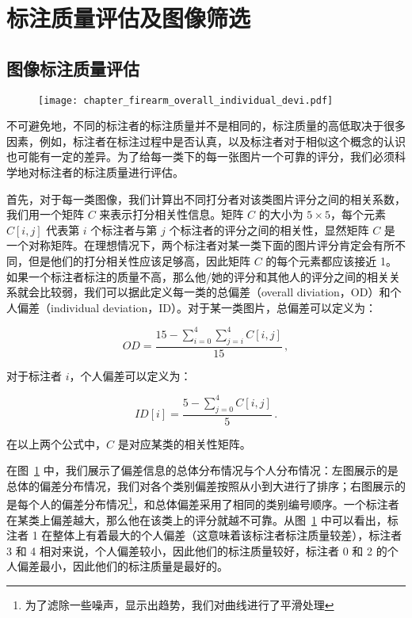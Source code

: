 \section{标注质量评估及图像筛选}\label{sec:label_quality_assess_filtering}
\subsection{图像标注质量评估}

\begin{figure}[t]
	\centering
	\texttt{[image: chapter\_firearm\_overall\_individual\_devi.pdf]}
	\label{fig:deviation_info}
\end{figure}

不可避免地，不同的标注者的标注质量并不是相同的，标注质量的高低取决于很多因素，例如，标注者在标注过程中是否认真，以及标注者对于相似这个概念的认识也可能有一定的差异。为了给每一类下的每一张图片一个可靠的评分，我们必须科学地对标注者的标注质量进行评估。

首先，对于每一类图像，我们计算出不同打分者对该类图片评分之间的相关系数，我们用一个矩阵 $C$ 来表示打分相关性信息。矩阵 $C$ 的大小为 $5 \times 5$，每个元素 $C[i,j]$ 代表第 $i$ 个标注者与第 $j$ 个标注者的评分之间的相关性，显然矩阵 $C$ 是一个对称矩阵。在理想情况下，两个标注者对某一类下面的图片评分肯定会有所不同，但是他们的打分相关性应该足够高，因此矩阵 $C$ 的每个元素都应该接近 1。如果一个标注者标注的质量不高，那么他/她的评分和其他人的评分之间的相关关系就会比较弱，我们可以据此定义每一类的总偏差（overall diviation，OD）和个人偏差（individual deviation，ID）。对于某一类图片，总偏差可以定义为：

\begin{equation}
OD = \frac{15 - \sum_{i=0}^{4}\sum_{j=i}^{4}C[i,j]}{15}\, ,
\end{equation}

对于标注者 $i$，个人偏差可以定义为：

\begin{equation}
	ID[i] = \frac{5 - \sum_{j=0}^{4}C[i, j]}{5}\, .
\end{equation}

在以上两个公式中，$C$ 是对应某类的相关性矩阵。

在图~\ref{fig:deviation_info} 中，我们展示了偏差信息的总体分布情况与个人分布情况：左图展示的是总体的偏差分布情况，我们对各个类别偏差按照从小到大进行了排序；右图展示的是每个人的偏差分布情况\footnote{为了滤除一些噪声，显示出趋势，我们对曲线进行了平滑处理}，和总体偏差采用了相同的类别编号顺序。一个标注者在某类上偏差越大，那么他在该类上的评分就越不可靠。从图~\ref{fig:deviation_info} 中可以看出，标注者 1 在整体上有着最大的个人偏差（这意味着该标注者标注质量较差），标注者 3 和 4 相对来说，个人偏差较小，因此他们的标注质量较好，标注者 0 和 2 的个人偏差最小，因此他们的标注质量是最好的。

